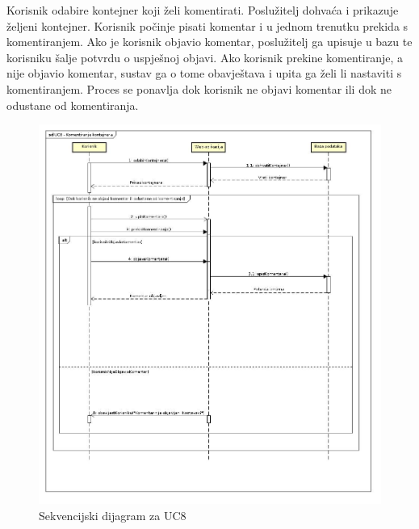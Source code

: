 			\clearpage
			\eject
			
			
			\noindent Korisnik odabire kontejner koji želi komentirati. Poslužitelj dohvaća i prikazuje željeni kontejner. Korisnik počinje pisati komentar i u jednom trenutku prekida s komentiranjem. Ako je korisnik objavio komentar, poslužitelj ga upisuje u bazu te korisniku šalje potvrdu o uspješnoj objavi. Ako korisnik prekine komentiranje, a nije objavio komentar, sustav ga o tome obavještava i upita ga želi li nastaviti s komentiranjem. Proces se ponavlja dok korisnik ne objavi komentar ili dok ne odustane od komentiranja.
			
			\eject
			
			\begin{figure}
				\centering
				\includegraphics[width=1.0\linewidth]{"slike/UC8-seq"}
				\caption{Sekvencijski dijagram za UC8}
				\label{fig:UC8-Seq}
			\end{figure}
			
			\clearpage
			
			\eject
			
			

